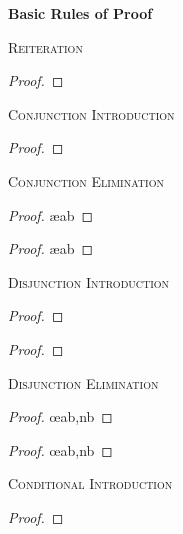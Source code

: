 \label{ProofRules}
{\LARGE \bf Basic Rules of Proof}

\textsc{Reiteration}

\begin{proof}
	 
\end{proof}


\textsc{Conjunction Introduction}

\begin{proof}
	 
\end{proof}

\textsc{Conjunction Elimination}

\begin{proof}
	 \ae{ab}
\end{proof}

\begin{proof}
	 \ae{ab}
\end{proof}

\textsc{Disjunction Introduction}

\begin{proof}
\end{proof}

\begin{proof}
\end{proof}

\textsc{Disjunction Elimination}

\begin{proof}
	 \oe{ab,nb}
\end{proof}

\begin{proof}
	 \oe{ab,nb}
\end{proof}


\textsc{Conditional Introduction}

\nopagebreak
\begin{proof}
	\open
		 
	\close
\end{proof}

